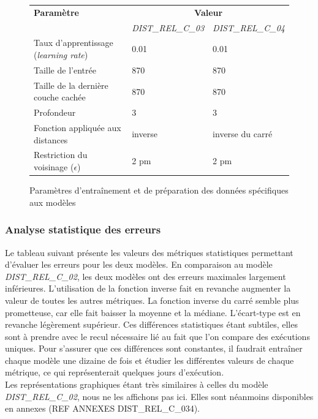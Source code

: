 \begin{figure}[!h]

	\centering
	\begin{tabular}{|l|l|l|}
		\hline
		\textbf{Paramètre} & \multicolumn{2}{|c|}{\textbf{Valeur}} \\ 
		 & \emph{DIST\_REL\_C\_03} & \emph{DIST\_REL\_C\_04} \\ \hline
		Taux d'apprentissage (\emph{learning rate}) & 0.01 & 0.01\\ \hline
		Taille de l'entrée & 870 & 870\\ \hline
		Taille de la dernière couche cachée & 870 & 870\\ \hline
		Profondeur & 3 & 3\\ \hline
		Fonction appliquée aux distances & inverse & inverse du carré\\ \hline
		Restriction du voisinage ($\epsilon$) & 2 pm & 2 pm\\ \hline
	\end{tabular}
	
	\caption{Paramètres d'entraînement et de préparation des données spécifiques aux modèles}
\end{figure}

\subsubsection{Analyse statistique des erreurs}

Le tableau suivant présente les valeurs des métriques statistiques permettant d'évaluer les erreurs pour les deux modèles. En comparaison au modèle \emph{DIST\_REL\_C\_02}, les deux modèles ont des erreurs maximales largement inférieures. L'utilisation de la fonction inverse fait en revanche augmenter la valeur de toutes les autres métriques. La fonction inverse du carré semble plus prometteuse, car elle fait baisser la moyenne et la médiane. L'écart-type est en revanche légèrement supérieur. Ces différences statistiques étant subtiles, elles sont à prendre avec le recul nécessaire lié au fait que l'on compare des exécutions uniques. Pour s'assurer que ces différences sont constantes, il faudrait entraîner chaque modèle une dizaine de fois et étudier les différentes valeurs de chaque métrique, ce qui représenterait quelques jours d'exécution.\\

Les représentations graphiques étant très similaires à celles du modèle \emph{DIST\_REL\_C\_02}, nous ne les affichons pas ici. Elles sont néanmoins disponibles en annexes (REF ANNEXES DIST\_REL\_C\_034).

